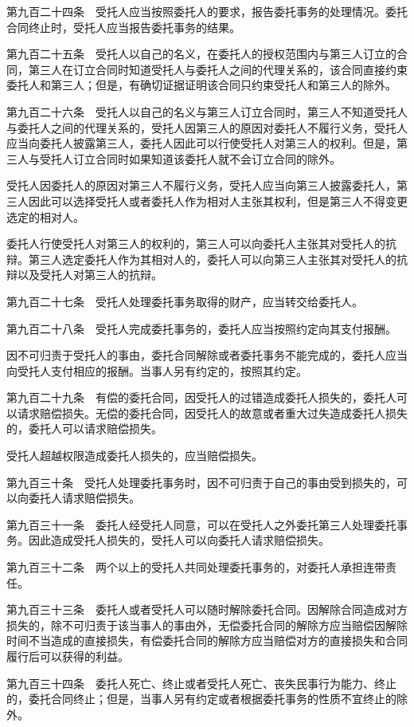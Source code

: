 \documentclass[UTF8,12pt,a4paper]{ctexbook}
\begin{document}
第九百二十四条　受托人应当按照委托人的要求，报告委托事务的处理情况。委托合同终止时，受托人应当报告委托事务的结果。

第九百二十五条　受托人以自己的名义，在委托人的授权范围内与第三人订立的合同，第三人在订立合同时知道受托人与委托人之间的代理关系的，该合同直接约束委托人和第三人；但是，有确切证据证明该合同只约束受托人和第三人的除外。

第九百二十六条　受托人以自己的名义与第三人订立合同时，第三人不知道受托人与委托人之间的代理关系的，受托人因第三人的原因对委托人不履行义务，受托人应当向委托人披露第三人，委托人因此可以行使受托人对第三人的权利。但是，第三人与受托人订立合同时如果知道该委托人就不会订立合同的除外。

受托人因委托人的原因对第三人不履行义务，受托人应当向第三人披露委托人，第三人因此可以选择受托人或者委托人作为相对人主张其权利，但是第三人不得变更选定的相对人。

委托人行使受托人对第三人的权利的，第三人可以向委托人主张其对受托人的抗辩。第三人选定委托人作为其相对人的，委托人可以向第三人主张其对受托人的抗辩以及受托人对第三人的抗辩。

第九百二十七条　受托人处理委托事务取得的财产，应当转交给委托人。

第九百二十八条　受托人完成委托事务的，委托人应当按照约定向其支付报酬。

因不可归责于受托人的事由，委托合同解除或者委托事务不能完成的，委托人应当向受托人支付相应的报酬。当事人另有约定的，按照其约定。

第九百二十九条　有偿的委托合同，因受托人的过错造成委托人损失的，委托人可以请求赔偿损失。无偿的委托合同，因受托人的故意或者重大过失造成委托人损失的，委托人可以请求赔偿损失。

受托人超越权限造成委托人损失的，应当赔偿损失。

第九百三十条　受托人处理委托事务时，因不可归责于自己的事由受到损失的，可以向委托人请求赔偿损失。

第九百三十一条　委托人经受托人同意，可以在受托人之外委托第三人处理委托事务。因此造成受托人损失的，受托人可以向委托人请求赔偿损失。

第九百三十二条　两个以上的受托人共同处理委托事务的，对委托人承担连带责任。

第九百三十三条　委托人或者受托人可以随时解除委托合同。因解除合同造成对方损失的，除不可归责于该当事人的事由外，无偿委托合同的解除方应当赔偿因解除时间不当造成的直接损失，有偿委托合同的解除方应当赔偿对方的直接损失和合同履行后可以获得的利益。

第九百三十四条　委托人死亡、终止或者受托人死亡、丧失民事行为能力、终止的，委托合同终止；但是，当事人另有约定或者根据委托事务的性质不宜终止的除外。
\end{document}
